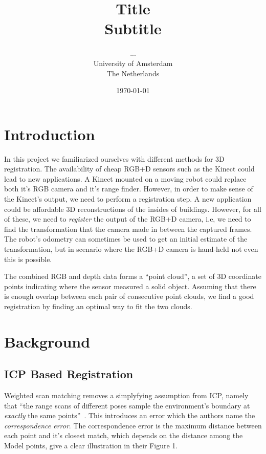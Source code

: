 \documentclass[a4paper]{article}
\title{Title\\
{\large Subtitle}}
\author{...\\
  University of Amsterdam\\
  The Netherlands}
\date{\today}
\begin{document}
\maketitle

\section{Introduction}

In this project we familiarized ourselves with different methods for 3D registration. The availability of cheap RGB+D sensors such as the Kinect could lead to new applications. A Kinect mounted on a moving robot could replace both it's RGB camera and it's range finder. However, in order to make sense of the Kinect's output, we need to perform a registration step. A new application could be affordable 3D reconstructions of the insides of buildings. However, for all of these, we need to \emph{register} the output of the RGB+D camera, i.e, we need to find the transformation that the camera made in between the captured frames. The robot's odometry can sometimes be used to get an initial estimate of the transformation, but in scenario where the RGB+D camera is hand-held not even this is possible.

The combined RGB and depth data forms a ``point cloud'', a set of 3D coordinate points indicating where the sensor measured a solid object. Assuming that there is enough overlap between each pair of consecutive point clouds, we find a good registration by finding an optimal way to fit the two clouds.

\section{Background}

\subsection{ICP Based Registration}




Weighted scan matching removes a simplyfying assumption from ICP, namely that ``the range scans of different poses sample the environment's boundary at \emph{exactly} the same points''~\cite{pfister2002weighted}. This introduces an error which the authors name the \emph{correspondence error}. The correspondence error is the maximum distance between each point and it's closest match, which depends on the distance among the Model points, \cite{slamet2008boosting} give a clear illustration in their Figure 1. 
\end{document}
